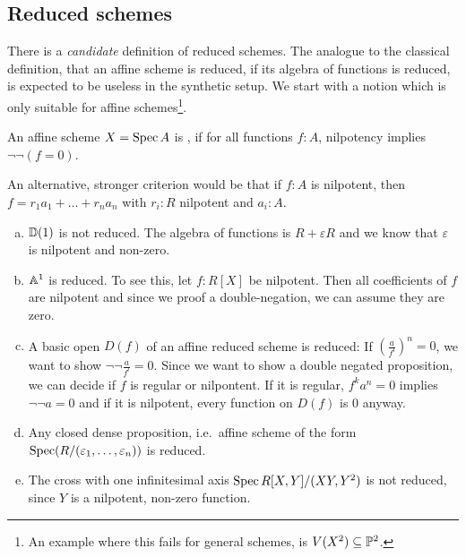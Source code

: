 
\subsection{Reduced schemes}


There is a \emph{candidate} definition of reduced schemes.
The analogue to the classical definition, that an affine scheme is reduced,
if its algebra of functions is reduced, is expected to be useless in the synthetic setup.
We start with a notion which is only suitable for affine schemes\footnote{An example where this fails for general schemes, is $V(X^2)\subseteq\mathbb{P}^2$.}.

\begin{definition}
  An affine scheme $X=\operatorname{Spec} A$ is ,
  if for all functions $f:A$, nilpotency implies $\neg\neg (f=0)$.
\end{definition}

An alternative, stronger criterion would be that if $f : A$ is nilpotent, then
$f = r_1 a_1 + \ldots + r_n a_n$ with $r_i : R$ nilpotent and $a_i : A$.

\begin{example}
  \begin{enumerate}[(a)]
  \item $\mathbb{D}(1)$ is not reduced.
    The algebra of functions is $R+\varepsilon R$ and we know that $\varepsilon$ is nilpotent and non-zero.
  \item $\mathbb{A}^1$ is reduced. To see this, let $f:R[X]$ be nilpotent.
    Then all coefficients of $f$ are nilpotent and since we proof a double-negation,
    we can assume they are zero.
  \item A basic open $D(f)$ of an affine reduced scheme is reduced:
    If $\left(\frac{a}{f^l}\right)^n=0$, we want to show $\neg\neg \frac{a}{f^l} = 0$.
    Since we want to show a double negated proposition, we can decide if $f$ is regular or nilpontent.
    If it is regular, $f^ka^n=0$ implies $\neg\neg a = 0$ and if it is nilpotent, every function on $D(f)$ is $0$ anyway.
  \item Any closed dense proposition, i.e.\ affine scheme of the form $\operatorname{Spec} (R/(\varepsilon_1,\dots,\varepsilon_n))$ is reduced.
  \item The cross with one infinitesimal axis $\operatorname{Spec} R[X,Y]/(XY,Y^2)$ is not reduced, since $Y$ is a nilpotent, non-zero function.
  \end{enumerate}
\end{example}

